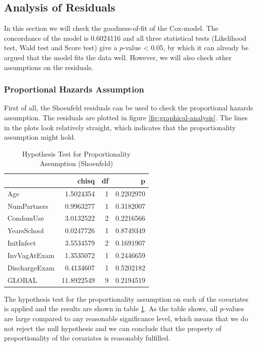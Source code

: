 \documentclass[
]{article}
\begin{document}
\hypertarget{analysis-of-residuals}{%
\subsection{Analysis of Residuals}\label{analysis-of-residuals}}

In this section we will check the goodness-of-fit of the Cox-model. The concordance of the model is 0.6024116 and all three statistical tests (Likelihood test, Wald test and Score test) give a \(p\)-value \textless{} 0.05, by which it can already be argued that the model fits the data well. However, we will also check other assumptions on the residuals.

\hypertarget{proportional-hazards-assumption}{%
\subsubsection{Proportional Hazards Assumption}\label{proportional-hazards-assumption}}

First of all, the Shoenfeld residuals can be used to check the proportional hazards assumption. The residuals are plotted in figure \ref{fig:graphical-analysis}. The lines in the plots look relatively straight, which indicates that the proportionality assumption might hold.

\begin{table}

\caption{\label{tab:schoenfeld-table}Hypothesis Test for Proportionality Assumption (Shoenfeld)}
\centering
\begin{tabular}[t]{l|r|r|r}
\hline
  & chisq & df & p\\
\hline
Age & 1.5024354 & 1 & 0.2202970\\
\hline
NumPartners & 0.9963277 & 1 & 0.3182007\\
\hline
CondomUse & 3.0132522 & 2 & 0.2216566\\
\hline
YearsSchool & 0.0247726 & 1 & 0.8749349\\
\hline
InitInfect & 3.5534579 & 2 & 0.1691907\\
\hline
InvVagAtExam & 1.3535072 & 1 & 0.2446659\\
\hline
DischargeExam & 0.4134607 & 1 & 0.5202182\\
\hline
GLOBAL & 11.8922549 & 9 & 0.2194519\\
\hline
\end{tabular}
\end{table}

The hypothesis test for the proportionality assumption on each of the covariates is applied and the results are shown in table \ref{tab:schoenfeld-table}. As the table shows, all \(p\)-values are large compared to any reasonable significance level, which means that we do not reject the null hypothesis and we can conclude that the property of proportionality of the covariates is reasonably fulfilled.
\end{document}
